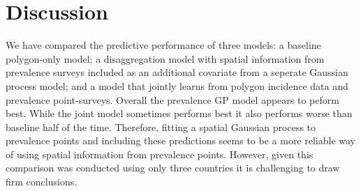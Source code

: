 \documentclass{statsoc}
\begin{document}






\begin{table}
\caption{\label{table3}Summary of coverage of 80\% credible intervals. The proportion of held out data points that fall within their 80\% credible intervals. 
Cases where this is below 0.7 are highlighted in bold.}
\centering
{}
\end{table}


\section*{Discussion}



We have compared the predictive performance of three models: a baseline polygon-only model; a disaggregation model with spatial information from prevalence surveys included as an additional covariate from a seperate Gaussian process model; and a model that jointly learns from polygon incidence data and prevalence point-surveys.
Overall the prevalence GP model appears to peform best.
While the joint model sometimes performs best it also performs worse than baseline half of the time.
Therefore, fitting a spatial Gaussian process to prevalence points and including these predictions seems to be a more reliable way of using spatial information from prevalence points.
 However, given this comparison was conducted using only three countries it is challenging to draw firm conclusions.
\end{document}
